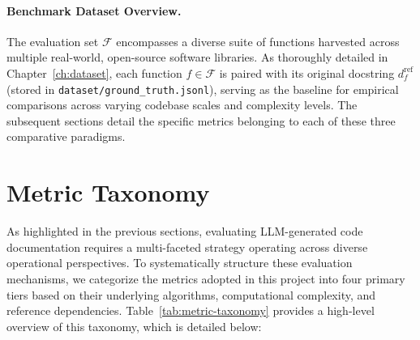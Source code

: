 \paragraph{Benchmark Dataset Overview.} 
The evaluation set $\mathcal{F}$ encompasses a diverse suite of functions harvested across multiple real-world, open-source software libraries. As thoroughly detailed in Chapter~\ref{ch:dataset}, each function $f \in \mathcal{F}$ is paired with its original docstring $d_f^{\mathrm{ref}}$ (stored in \texttt{dataset/ground\_truth.jsonl}), serving as the baseline for empirical comparisons across varying codebase scales and complexity levels. The subsequent sections detail the specific metrics belonging to each of these three comparative paradigms.


\section{Metric Taxonomy} \label{sec:metrics-taxonomy} 
As highlighted in the previous sections, evaluating LLM-generated code documentation requires a multi-faceted strategy operating across diverse operational perspectives. To systematically structure these evaluation mechanisms, we categorize the metrics adopted in this project into four primary tiers based on their underlying algorithms, computational complexity, and reference dependencies. Table~\ref{tab:metric-taxonomy} provides a high-level overview of this taxonomy, which is detailed below: 

